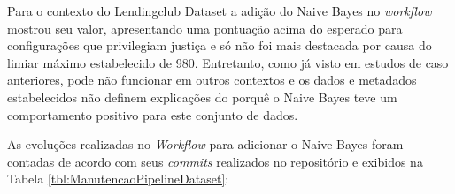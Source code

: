 \documentclass[portugues]{ic-tese}
\begin{document}
Para o contexto do Lendingclub Dataset a adição do Naive Bayes no \textit{workflow} mostrou seu valor, apresentando uma pontuação acima do esperado para configurações que privilegiam justiça e só não foi mais destacada por causa do limiar máximo estabelecido de 980. Entretanto, como já visto em estudos de caso anteriores, pode não funcionar em outros contextos e os dados e metadados estabelecidos não definem explicações do porquê o Naive Bayes teve um comportamento positivo para este conjunto de dados.

As evoluções realizadas no \textit{Workflow} para adicionar o Naive Bayes foram contadas de acordo com seus \textit{commits} realizados no repositório e exibidos  na Tabela \ref{tbl:ManutencaoPipelineDataset}:

\begin{table}[H]
\begin{center}
  \caption{Quantidade de modificações realizadas ao adicionar um novo algoritmo ao \textit{Workflow}}
\label{tbl:ManutencaoPipelineCaso3}
\end{center}
\end{table}
\end{document}
